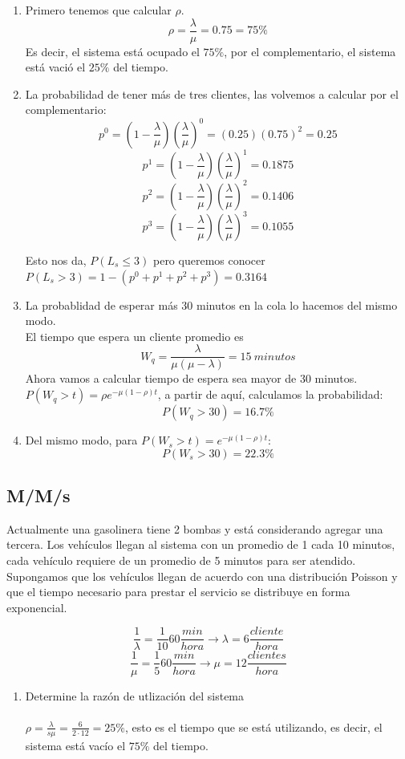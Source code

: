 \begin{enumerate}
	\item Primero tenemos que calcular $\rho$. \\
	$$\rho=\frac{\lambda}{\mu}=0.75=75 \%$$
	Es decir, el sistema está ocupado el $75\%$, por el complementario, el sistema está vació el $ 25 \% $ del tiempo.
	\item La probabilidad de tener más de tres clientes, las volvemos a calcular por el complementario:
	$$p^0=(1-\frac{\lambda}{\mu})(\frac{\lambda}{\mu})^0=(0.25)(0.75)^2=0.25$$
		$$p^1=(1-\frac{\lambda}{\mu})(\frac{\lambda}{\mu})^1=0.1875$$
			$$p^2=(1-\frac{\lambda}{\mu})(\frac{\lambda}{\mu})^2=0.1406$$
			$$p^3=(1-\frac{\lambda}{\mu})(\frac{\lambda}{\mu})^3=0.1055$$
	
	Esto nos da, $P(L_s \leq 3)$ pero queremos conocer $P(L_s > 3)=1-(p^0+p^1+p^2+p^3)=0.3164$
	
	\item La probablidad de esperar más 30 minutos en la cola lo hacemos del mismo modo. \\
	El tiempo que espera un cliente promedio es 
	$$ W_q=\frac{\lambda}{\mu(\mu-\lambda)}=15 ~ minutos$$
	Ahora vamos a calcular tiempo de espera sea mayor de 30 minutos. \\
	$P(W_q>t)=\rho e^{-\mu (1-\rho)t}$, a partir de aquí, calculamos la probabilidad:
	$$P(W_q > 30)=16.7\%$$
	\item Del mismo modo, para $P(W_s > t)=e^{-\mu(1-\rho)t}$:
	$$ P(W_s > 30)=22.3 \% $$
\end{enumerate} 

\subsection{M/M/s}
Actualmente una gasolinera tiene 2 bombas y está considerando agregar una tercera. Los vehículos llegan al sistema con un promedio de 1 cada 10 minutos, cada vehículo requiere de un promedio de 5 minutos para ser atendido. Supongamos que los vehículos llegan de acuerdo con una distribución Poisson y que el tiempo necesario para prestar el servicio se distribuye en forma exponencial.

$$ \frac{1}{\lambda}=\frac{1}{10} 60 \frac{min}{hora} \longrightarrow \lambda = 6 \frac{cliente}{hora} $$
$$ \frac{1}{\mu} = \frac{1}{5} 60  \frac{min}{hora} \longrightarrow \mu = 12 \frac{clientes}{hora} $$
\begin{enumerate}
	\item Determine la razón de utlización del sistema \\ \\ $\rho=\frac{\lambda}{s \mu}=\frac{6}{2 \cdot 12}=25 \%$, esto es el tiempo que se está utilizando, es decir, el sistema está vacío el $75 \%$ del tiempo.
\end{enumerate}

